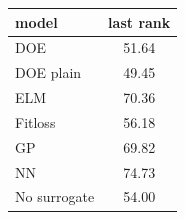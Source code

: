 \begin{tabular}{|lc|}
\hline
model & last rank\\
\hline
DOE & 51.64 \\
DOE plain & 49.45 \\
ELM & 70.36 \\
Fitloss & 56.18 \\
GP & 69.82 \\
NN & 74.73 \\
No surrogate & 54.00 \\
\hline
\end{tabular}
